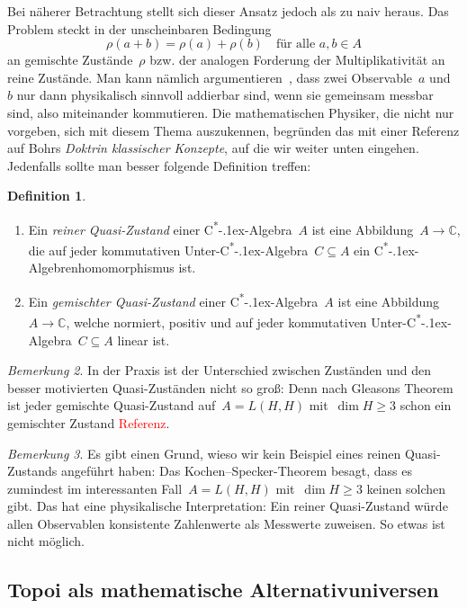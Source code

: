 \documentclass[a4paper,ngerman,12pt]{scrartcl}
\theoremstyle{definition}
\newtheorem{defn}{Definition}[section]
\theoremstyle{plain}
\theoremstyle{remark}
\newtheorem{bem}[defn]{Bemerkung}
\newcommand{\CC}{\mathbb{C}}
\newcommand{\csalgebra}{C\textsuperscript{*}\kern-.1ex-Algebra}
\newcommand{\csalgebren}{C\textsuperscript{*}\kern-.1ex-Alge\-bren}
\renewcommand{\_}{\mathpunct{.}\,}
\newcommand{\?}{\,{:}\,}
\newcommand{\XXX}[1]{\textcolor{red}{#1}}
\begin{document}
Bei näherer Betrachtung stellt sich dieser Ansatz jedoch als zu naiv heraus. Das
Problem steckt in der unscheinbaren Bedingung
\[ \rho(a + b) = \rho(a) + \rho(b) \quad\text{für alle~$a,b \in A$} \]
an gemischte Zustände~$\rho$ bzw. der analogen Forderung der
Multiplikativität an reine Zustände. Man kann nämlich
argumentieren~\cite[Seite~27]{topos:aqt},
dass zwei Observable~$a$ und~$b$ nur dann physikalisch sinnvoll addierbar sind,
wenn sie gemeinsam messbar sind, also miteinander kommutieren. Die
mathematischen Physiker, die nicht nur vorgeben, sich mit diesem Thema
auszukennen, begründen das mit einer Referenz auf Bohrs \emph{Doktrin
klassischer Konzepte}, auf die wir weiter unten eingehen. Jedenfalls sollte man
besser folgende Definition treffen:

\begin{defn}\begin{enumerate}
\item
Ein \emph{reiner Quasi-Zustand} einer \csalgebra~$A$ ist eine Abbildung~$A \to \CC$,
die auf jeder kommutativen Unter-\csalgebra~$C \subseteq A$ ein
\csalgebren\-homo\-mor\-phis\-mus ist.
\item Ein \emph{gemischter Quasi-Zustand} einer \csalgebra~$A$ ist eine Abbildung~$A
\to \CC$, welche normiert, positiv und auf jeder kommutativen
Unter-\csalgebra~$C \subseteq A$ linear ist.
\end{enumerate}
\end{defn}

\begin{bem}In der Praxis ist der Unterschied zwischen Zuständen und den besser
motivierten Quasi-Zuständen nicht so groß: Denn nach Gleasons Theorem ist jeder
gemischte Quasi-Zustand auf~$A = L(H,H)$ mit~$\dim H \geq 3$ schon ein
gemischter Zustand \XXX{Referenz}.\end{bem}

\begin{bem}\label{bem:keine-reinen-quasi-zustaende}%
Es gibt einen Grund, wieso wir kein Beispiel eines reinen Quasi-Zustands
angeführt haben: Das Kochen--Specker-Theorem besagt, dass es zumindest im
interessanten Fall~$A = L(H,H)$ mit~$\dim H \geq 3$ keinen solchen gibt. Das
hat eine physikalische Interpretation: Ein reiner Quasi-Zustand würde allen
Observablen konsistente Zahlenwerte als Messwerte zuweisen. So etwas ist nicht
möglich.\end{bem}


\subsection{Topoi als mathematische Alternativuniversen}
\end{document}
